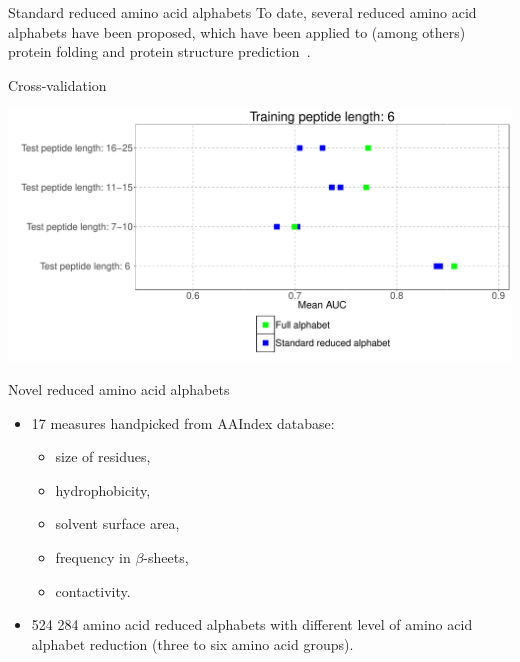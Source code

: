 \documentclass{beamer}\usepackage[]{graphicx}\usepackage[]{color}
\makeatletter
\def\maxwidth{ %
  \ifdim\Gin@nat@width>\linewidth
    \linewidth
  \else
    \Gin@nat@width
  \fi
}
\newenvironment{knitrout}{}{} %
\makeatother
\begin{document}
\begin{frame}{Standard reduced amino acid alphabets}
To date, several reduced amino acid alphabets have been proposed, which have been applied to (among others) protein folding and protein structure prediction~\citep{kosiol_new_2004, melo_accuracy_2006}.
  \end{frame}


    \begin{frame}{Cross-validation}
\begin{knitrout}
\color{fgcolor}

{\centering \includegraphics[width=\maxwidth]{figure/unnamed-chunk-2-1} 

}



\end{knitrout}
  
  \end{frame}


\begin{frame}{Novel reduced amino acid alphabets}

\begin{itemize}
\item 17 measures handpicked from AAIndex database: 
  \begin{itemize}
    \item size of residues, 
    \item hydrophobicity, 
    \item solvent surface area, 
    \item frequency in $\beta$-sheets,
    \item contactivity.
  \end{itemize}
  \item 524 284 amino acid reduced alphabets with different level of amino acid alphabet reduction (three to six amino acid groups).
  \end{itemize}

    \end{frame}
  
\end{document}
